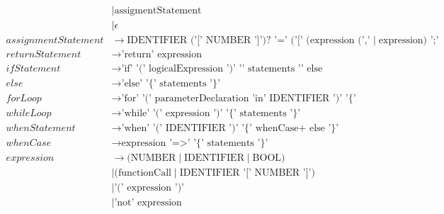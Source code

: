 \begin{align*}
                            & \mid \text{assigmentStatement}                                                                                    \\
                            & \mid \epsilon                                                                                                     \\
    assignmentStatement     & \to \text{IDENTIFIER ('[' NUMBER ']')? '=' ('[' (expression (',' expression)*)? ']'} \mid  \text{expression) ';'} \\
    returnStatement         & \to \text{'return' expression}                                                                                    \\
    ifStatement             & \to \text{'if' '(' logicalExpression ')' '{' statements '}' else}                                                 \\
    else                    & \to \text{'else' '\{' statements '\}'}                                                                            \\
    forLoop                 & \to \text{'for' '(' parameterDeclaration 'in' IDENTIFIER ')' '\{' statements '\}'}                                \\
    whileLoop               & \to \text{'while' '(' expression ')' '\{' statements '\}'}                                                        \\
    whenStatement           & \to \text{'when' '(' IDENTIFIER ')' '\{' whenCase+ else '\}'}                                                     \\
    whenCase                & \to \text{expression '=>' '\{' statements '\}'}                                                                   \\
    expression              & \to \text{(NUMBER} \mid \text{IDENTIFIER} \mid \text{BOOL)}                                                       \\
                            & \mid \text{(functionCall} \mid \text{IDENTIFIER '[' NUMBER ']')}                                                  \\
                            & \mid \text{'(' expression ')'}                                                                                    \\
                            & \mid \text{'not' expression}                                                                                      \\

\end{align*}
